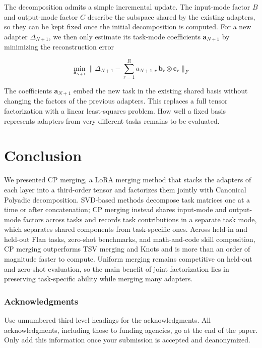 \documentclass[10pt]{article} %
\begin{document}
The decomposition admits a simple incremental update. The input-mode factor $B$ and output-mode factor $C$ describe the subspace shared by the existing adapters, so they can be kept fixed once the initial decomposition is computed. For a new adapter $\Delta_{N+1}$, we then only estimate its task-mode coefficients $\mathbf{a}_{N+1}$ by minimizing the reconstruction error

\begin{equation}
    \min_{\mathbf{a}_{N+1}} \|\Delta_{N+1} - \sum_{r=1}^{R} a_{N+1,r}\, \mathbf{b}_r \otimes \mathbf{c}_r\|_F
\end{equation}

The coefficients $\mathbf{a}_{N+1}$ embed the new task in the existing shared basis without changing the factors of the previous adapters. This replaces a full tensor factorization with a linear least-squares problem. How well a fixed basis represents adapters from very different tasks remains to be evaluated.


\section{Conclusion}
We presented CP merging, a LoRA merging method that stacks the adapters of each layer into a third-order tensor and factorizes them jointly with Canonical Polyadic decomposition. SVD-based methods decompose task matrices one at a time or after concatenation; CP merging instead shares input-mode and output-mode factors across tasks and records task contributions in a separate task mode, which separates shared components from task-specific ones. Across held-in and held-out Flan tasks, zero-shot benchmarks, and math-and-code skill composition, CP merging outperforms TSV merging and Knots and is more than an order of magnitude faster to compute. Uniform merging remains competitive on held-out and zero-shot evaluation, so the main benefit of joint factorization lies in preserving task-specific ability while merging many adapters.



\subsubsection*{Acknowledgments}
Use unnumbered third level headings for the acknowledgments. All
acknowledgments, including those to funding agencies, go at the end of the paper.
Only add this information once your submission is accepted and deanonymized. 



\end{document}
